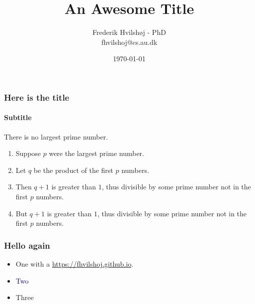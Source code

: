 \documentclass{beamer}
\title{An Awesome Title}
\author{Frederik Hvilshøj - PhD \\ \footnotesize fhvilshoj@cs.au.dk}
\date{\today}
\begin{document}
\begin{frame}
\titlepage
\end{frame}

\begin{frame}
\frametitle{Here is the title}
\framesubtitle{Subtitle}

\begin{theorem}
There is no largest prime number.
\end{theorem}

\begin{enumerate}
	\item<1-| alert@1> Suppose $p$ were the largest prime number.
	\item<2-> Let $q$ be the product of the first $p$ numbers.
	\item<3-> Then $q+1$ is greater than $1$, thus divisible by some prime number not in the first $p$ numbers.
	\item<1-> But $q+1$ is greater than $1$, thus divisible by some prime number not in the first $p$ numbers.
\end{enumerate}
\end{frame}

\begin{frame}
	\frametitle{Hello again}
\begin{itemize}
	\item One with a \url{https://fhvilshoj.github.io}.
	\item \textcolor{darkblue}{Two}
	\item Three
\end{itemize}
\end{frame}
\end{document}

